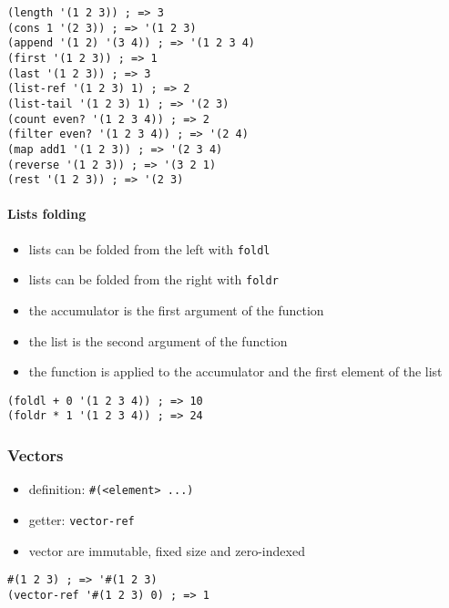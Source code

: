 \documentclass[a4paper,landscape,10pt]{article}
\begin{document}
\begin{multicols*}{2}
  \begin{lstlisting}[language=Racket]
(length '(1 2 3)) ; => 3
(cons 1 '(2 3)) ; => '(1 2 3)
(append '(1 2) '(3 4)) ; => '(1 2 3 4)
(first '(1 2 3)) ; => 1
(last '(1 2 3)) ; => 3
(list-ref '(1 2 3) 1) ; => 2
(list-tail '(1 2 3) 1) ; => '(2 3)
(count even? '(1 2 3 4)) ; => 2
(filter even? '(1 2 3 4)) ; => '(2 4)
(map add1 '(1 2 3)) ; => '(2 3 4)
(reverse '(1 2 3)) ; => '(3 2 1)
(rest '(1 2 3)) ; => '(2 3)
\end{lstlisting}

  \vfill

  \paragraph{Lists folding}

  \begin{itemize}
    \item lists can be folded from the left with \lstinline[language=Racket]!foldl!
    \item lists can be folded from the right with \lstinline[language=Racket]!foldr!
    \item the accumulator is the first argument of the function
    \item the list is the second argument of the function
    \item the function is applied to the accumulator and the first element of the list
  \end{itemize}

  \begin{lstlisting}[language=Racket]
(foldl + 0 '(1 2 3 4)) ; => 10
(foldr * 1 '(1 2 3 4)) ; => 24
  \end{lstlisting}

  \subsubsection{Vectors}

  \begin{itemize}
    \item definition: \lstinline[language=Racket]!#(<element> ...)!
    \item getter: \lstinline[language=Racket]!vector-ref!
    \item vector are immutable, fixed size and zero-indexed
  \end{itemize}

  \begin{lstlisting}[language=Racket]
#(1 2 3) ; => '#(1 2 3)
(vector-ref '#(1 2 3) 0) ; => 1
  \end{lstlisting}


\end{multicols*}
\end{document}
